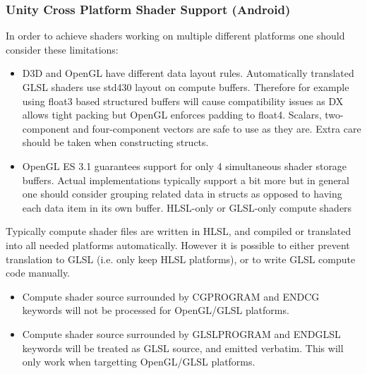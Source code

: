 \documentclass[a4paper,10pt]{article}
\begin{document}
\subsubsection{Unity Cross Platform Shader Support (Android)}
In order to achieve shaders working on multiple different platforms one should consider these limitations:

\begin{itemize}
\item 
D3D and OpenGL have different data layout rules. Automatically translated GLSL shaders use std430 layout on compute buffers. Therefore for example using float3 based structured buffers will cause compatibility issues as DX allows tight packing but OpenGL enforces padding to float4. Scalars, two-component and four-component vectors are safe to use as they are. Extra care should be taken when constructing structs.
\item 
OpenGL ES 3.1 guarantees support for only 4 simultaneous shader storage buffers. Actual implementations typically support a bit more but in general one should consider grouping related data in structs as opposed to having each data item in its own buffer.
HLSL-only or GLSL-only compute shaders

\end{itemize}

Typically compute shader files are written in HLSL, and compiled or translated into all needed platforms automatically. However it is possible to either prevent translation to GLSL (i.e. only keep HLSL platforms), or to write GLSL compute code manually.
\begin{itemize}
\item Compute shader source surrounded by CGPROGRAM and ENDCG keywords will not be processed for OpenGL/GLSL platforms.
\item Compute shader source surrounded by GLSLPROGRAM and ENDGLSL keywords will be treated as GLSL source, and emitted verbatim. This will only work when targetting OpenGL/GLSL platforms.
\end{itemize}
\pagebreak
\end{document}
